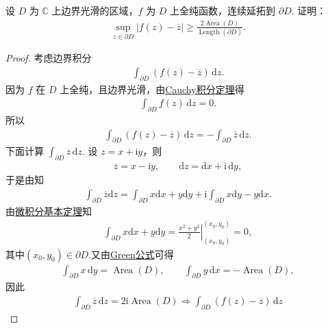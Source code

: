\documentclass[../../main.tex]{subfiles}%
\begin{document}
\begin{example}
设 $D$ 为 $\mathbb{C}$ 上边界光滑的区域，$f$ 为 $D$ 上全纯函数，连续延拓到 $\partial D$. 证明：
\begin{align*}
\sup_{z \in \partial D} |f(z) - \overline{z}| \geqslant \frac{2 \operatorname{Area}(D)}{\operatorname{Length}(\partial D)}.
\end{align*}
\end{example}
\begin{proof}
考虑边界积分
\begin{align*}
\int_{\partial D} (f(z) - \overline{z}) \, \mathrm{d}z.
\end{align*}
因为 $f$ 在 $D$ 上全纯，且边界光滑，由\hyperref[theorem:Cauchy-Goursat定理(Cauchy积分定理)]{Cauchy积分定理}得
\begin{align*}
\int_{\partial D} f(z) \, \mathrm{d}z = 0.
\end{align*}
所以
\begin{align}\label{eq::HFWUFOW344123-2-4-24}
\int_{\partial D} (f(z) - \overline{z}) \, \mathrm{d}z
= - \int_{\partial D} \overline{z} \, \mathrm{d}z.
\end{align}
下面计算 $\int_{\partial D} \overline{z} \, \mathrm{d}z$. 设 $z = x + \mathrm{i}y$，则
\begin{align*}
\overline{z} = x - \mathrm{i}y, \qquad \mathrm{d}z = \mathrm{d}x + \mathrm{i}\,\mathrm{d}y,
\end{align*}
于是由知
\begin{align*}
\int_{\partial D}{\overline{z}\mathrm{d}z}=\int_{\partial D}{x\mathrm{d}x+y\mathrm{d}y}+\mathrm{i}\int_{\partial D}{x\mathrm{d}y-y\mathrm{d}x}.
\end{align*}
由\hyperref[theorem:复积分的微积分基本定理]{微积分基本定理}知
\begin{align*}
\int_{\partial D}{x\mathrm{d}x+y\mathrm{d}y}=\left.\frac{x^2+y^2}{2}\right| _{\left( x_0,y_0 \right)}^{\left( x_0,y_0 \right)}=0,
\end{align*}
其中$(x_0,y_0)\in \partial D$.又由\hyperref[Basis of Analytics-theorem:Green公式--数分]{Green公式}可得
\begin{align*}
\int_{\partial D} x\,\mathrm{d}y = \operatorname{Area}(D), \qquad
\int_{\partial D} y\,\mathrm{d}x = - \operatorname{Area}(D),
\end{align*}
因此
\begin{align*}
\int_{\partial D} \overline{z} \, \mathrm{d}z = 2\mathrm{i} \operatorname{Area}(D)\Longrightarrow
\int_{\partial D} (f(z) - \overline{z}) \, \mathrm{d}z

\end{align*}
\end{proof}
\end{document}
